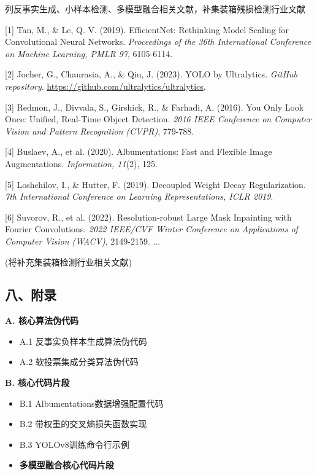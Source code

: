 \documentclass[
]{article}
\begin{document}
列反事实生成、小样本检测、多模型融合相关文献，补集装箱残损检测行业文献

{[}1{]} Tan, M., \& Le, Q. V. (2019). EfficientNet: Rethinking Model
Scaling for Convolutional Neural Networks. \emph{Proceedings of the 36th
International Conference on Machine Learning, PMLR 97}, 6105-6114.

{[}2{]} Jocher, G., Chaurasia, A., \& Qiu, J. (2023). YOLO by
Ultralytics. \emph{GitHub repository}.
\url{https://github.com/ultralytics/ultralytics}.

{[}3{]} Redmon, J., Divvala, S., Girshick, R., \& Farhadi, A. (2016).
You Only Look Once: Unified, Real-Time Object Detection. \emph{2016 IEEE
Conference on Computer Vision and Pattern Recognition (CVPR)}, 779-788.

{[}4{]} Buslaev, A., et al. (2020). Albumentations: Fast and Flexible
Image Augmentations. \emph{Information, 11}(2), 125.

{[}5{]} Loshchilov, I., \& Hutter, F. (2019). Decoupled Weight Decay
Regularization. \emph{7th International Conference on Learning
Representations, ICLR 2019}.

{[}6{]} Suvorov, R., et al. (2022). Resolution-robust Large Mask
Inpainting with Fourier Convolutions. \emph{2022 IEEE/CVF Winter
Conference on Applications of Computer Vision (WACV)}, 2149-2159. ...

(将补充集装箱检测行业相关文献)

\subsection{八、附录}\label{ux516bux9644ux5f55}

\textbf{A. 核心算法伪代码}

\begin{itemize}
\item
  A.1 反事实负样本生成算法伪代码
\item
  A.2 软投票集成分类算法伪代码
\end{itemize}

\textbf{B. 核心代码片段}

\begin{itemize}
\item
  B.1 Albumentations数据增强配置代码
\item
  B.2 带权重的交叉熵损失函数实现
\item
  B.3 YOLOv8训练命令行示例
\item
  \textbf{多模型融合核心代码片段}
\end{itemize}
\end{document}
